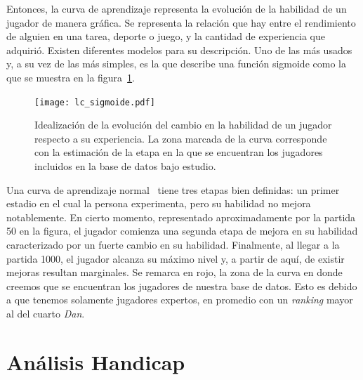 \documentclass[11pt,twoside, spanish]{report} %
\begin{document}
Entonces, la curva de aprendizaje representa la evoluci\'on de la habilidad de un jugador de manera gr\'afica.
Se representa la relaci\'on que hay entre el rendimiento de alguien en una tarea, deporte o juego, y la cantidad de experiencia que adquiri\'o.
Existen diferentes modelos para su descripci\'on.
Uno de las m\'as usados y, a su vez de las m\'as simples, es la que describe una funci\'on sigmoide como la que se muestra en la figura~\ref{fig:lc_sigmoide}.

\begin{figure}[H]
	\centering
	\texttt{[image: lc\_sigmoide.pdf]}
	\caption{Idealizaci\'on de la evoluci\'on del cambio en la habilidad de un jugador respecto a su experiencia. La zona marcada de la curva corresponde con la estimaci\'on de la etapa en la que se encuentran los jugadores incluidos en la base de datos bajo estudio.}
	\label{fig:lc_sigmoide}
\end{figure}


Una curva de aprendizaje normal~\cite{newell1981-skillAcquisitionAndLawOfPractice} tiene tres etapas bien definidas: un primer estadio en el cual la persona experimenta, pero su habilidad no mejora notablemente.
En cierto momento, representado aproximadamente por la partida 50 en la figura, el jugador comienza una segunda etapa de mejora en su habilidad caracterizado por un fuerte cambio en su habilidad.
Finalmente, al llegar a la partida 1000, el jugador alcanza su m\'aximo nivel y, a partir de aqu\'i, de existir mejoras resultan marginales.
Se remarca en rojo, la zona de la curva en donde creemos que se encuentran los jugadores de nuestra base de datos.
Esto es debido a que tenemos solamente jugadores expertos, en promedio con un \textit{ranking} mayor al del cuarto \textit{Dan}.




\section{An\'alisis Handicap}
\label{chap:handicap}

\end{document}
